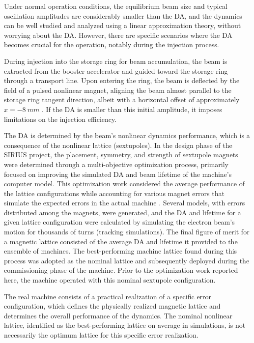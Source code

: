 Under normal operation conditions, the equilibrium beam size and typical oscillation amplitudes are considerably smaller than the DA, and the dynamics can be well studied and analyzed using a linear approximation theory, without worrying about the DA. However, there are specific scenarios where the DA becomes crucial for the operation, notably during the injection process.

During injection into the storage ring for beam accumulation, the beam is extracted from the booster accelerator and guided toward the storage ring through a transport line. Upon entering the ring, the beam is deflected by the field of a pulsed nonlinear magnet, aligning the beam almost parallel to the storage ring tangent direction, albeit with a horizontal offset of approximately $x=-8~\unit{mm}$ \cite{liu_injection_2016}. If the DA is smaller than this initial amplitude, it imposes limitations on the injection efficiency.

The DA is determined by the beam's nonlinear dynamics performance, which is a consequence of the nonlinear lattice (sextupoles). In the design phase of the SIRIUS project, the placement, symmetry, and strength of sextupole magnets were determined through a multi-objective optimization process, primarily focused on improving the simulated DA and beam lifetime of the machine's computer model\cite{de_sa_optimization_2016, dester_energy_2017}. This optimization work considered the average performance of the lattice configurations while accounting for various magnet errors that simulate the expected errors in the actual machine \cite{de_sa_optimization_2016}. Several models, with errors distributed among the magnets, were generated, and the DA and lifetime for a given lattice configuration were calculated by simulating the electron beam's motion for thousands of turns (tracking simulations). The final figure of merit for a magnetic lattice consisted of the average DA and lifetime it provided to the ensemble of machines. The best-performing machine lattice found during this process was adopted as the nominal lattice and subsequently deployed during the commissioning phase of the machine. Prior to the optimization work reported here, the machine operated with this nominal sextupole configuration.

The real machine consists of a practical realization of a specific error configuration, which defines the physically realized magnetic lattice and determines the overall performance of the dynamics. The nominal nonlinear lattice, identified as the best-performing lattice on average in simulations, is not necessarily the optimum lattice for this specific error realization.

